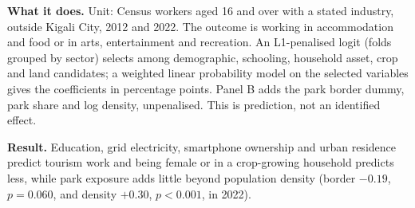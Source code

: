 \documentclass[11pt]{article}
\begin{document}
{\footnotesize
\textbf{What it does.} Unit: Census workers aged 16 and over with a stated industry, outside Kigali City, 2012 and 2022. The outcome is working in accommodation and food or in arts, entertainment and recreation. An L1-penalised logit (folds grouped by sector) selects among demographic, schooling, household asset, crop and land candidates; a weighted linear probability model on the selected variables gives the coefficients in percentage points. Panel B adds the park border dummy, park share and log density, unpenalised. This is prediction, not an identified effect.

\textbf{Result.} Education, grid electricity, smartphone ownership and urban residence predict tourism work and being female or in a crop-growing household predicts less, while park exposure adds little beyond population density (border $-0.19$, $p=0.060$, and density $+0.30$, $p<0.001$, in 2022).
}
\end{document}
